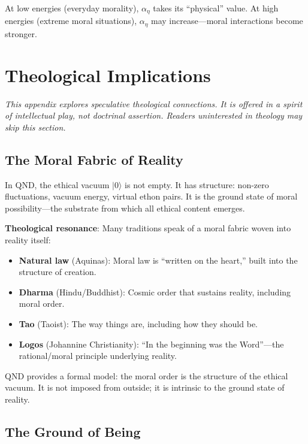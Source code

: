 \documentclass[12pt]{article}
\begin{document}
At low energies (everyday morality), $\alpha_\eta$ takes its ``physical'' value. At high energies (extreme moral situations), $\alpha_\eta$ may increase---moral interactions become stronger.

\section{Theological Implications}

\emph{This appendix explores speculative theological connections. It is offered in a spirit of intellectual play, not doctrinal assertion. Readers uninterested in theology may skip this section.}

\subsection{The Moral Fabric of Reality}

In QND, the ethical vacuum $|0\rangle$ is not empty. It has structure: non-zero fluctuations, vacuum energy, virtual ethon pairs. It is the ground state of moral possibility---the substrate from which all ethical content emerges.

\textbf{Theological resonance}: Many traditions speak of a moral fabric woven into reality itself:
\begin{itemize}
    \item \textbf{Natural law} (Aquinas): Moral law is ``written on the heart,'' built into the structure of creation.
    \item \textbf{Dharma} (Hindu/Buddhist): Cosmic order that sustains reality, including moral order.
    \item \textbf{Tao} (Taoist): The way things are, including how they should be.
    \item \textbf{Logos} (Johannine Christianity): ``In the beginning was the Word''---the rational/moral principle underlying reality.
\end{itemize}

QND provides a formal model: the moral order is the structure of the ethical vacuum. It is not imposed from outside; it is intrinsic to the ground state of reality.

\subsection{The Ground of Being}
\end{document}
